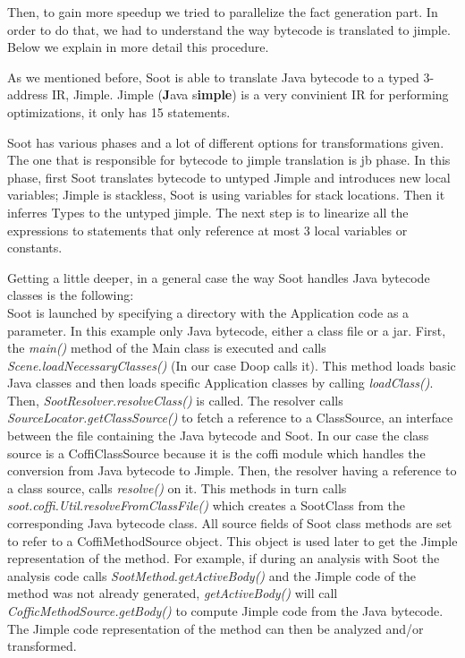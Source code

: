 \documentclass{dithesis}
\begin{document}
    	Then, to gain more speedup we tried to parallelize the fact generation part. In order to do that, we had to understand the way bytecode is translated to jimple. Below we explain in more detail this procedure. 

        As we mentioned before, Soot is able to translate Java bytecode to a typed 3-address IR, Jimple. Jimple (\textbf{J}ava s\textbf{imple}) is a very convinient IR for performing optimizations, it only has 15 statements.

        Soot has various phases and a lot of different options for transformations given. The one that is responsible for bytecode to jimple translation is jb phase. In this phase, first Soot translates bytecode to untyped Jimple and introduces new local variables; Jimple is stackless, Soot is using variables for stack locations. Then it inferres Types to the untyped jimple. The next step is to linearize all the expressions to statements that only reference at most 3 local variables or constants. 

        Getting a little deeper, in a general case the way Soot handles Java bytecode classes is the following: \\
        Soot is launched by specifying a directory with the Application code as a parameter. In this example only Java bytecode, either a class file or a jar. First, the \textit{main()} method of the Main class is executed and calls \textit{Scene.loadNecessaryClasses()} (In our case Doop calls it). This method loads basic Java classes and then loads specific Application classes by calling \textit{loadClass()}. Then, \textit{SootResolver.resolveClass()} is called. The resolver calls \textit{SourceLocator.getClassSource()} to fetch a reference to a ClassSource, an interface between the file containing the Java bytecode and Soot. In our case the class source is a CoffiClassSource because it is the coffi module which handles the conversion from Java bytecode to Jimple. Then, the resolver having a reference to a class source, calls \textit{resolve()} on it. This methods in turn calls \textit{soot.coffi.Util.resolveFromClassFile()} which creates a SootClass from the corresponding Java bytecode class. All source fields of Soot class methods are set to refer to a CoffiMethodSource object. This object is used later to get the Jimple representation of the method. For example, if during an analysis with Soot the analysis code calls \textit{SootMethod.getActiveBody()} and the Jimple code of the method was not already generated, \textit{getActiveBody()} will call \textit{CofficMethodSource.getBody()} to compute Jimple code from the Java bytecode. The Jimple code representation of the method can then be analyzed and/or transformed.
\end{document}
